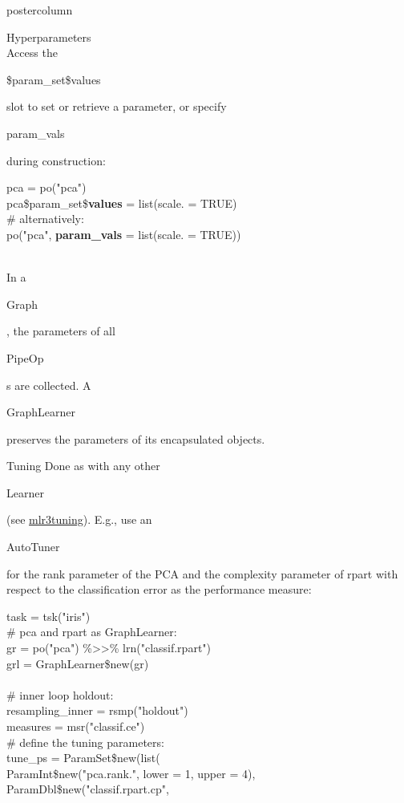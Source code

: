 \documentclass{beamer}
\newcommand{\codeinline}[1]{\begin{codeboxinline}#1\end{codeboxinline}}
\begin{document}
\begin{frame}[fragile]{}
\begin{columns}
\begin{column}{.245\textwidth}
\begin{beamercolorbox}[center]{postercolumn}
\begin{minipage}{.98\textwidth}
{\begin{myblock}{Hyperparameters}
              \ \\
              Access the \codeinline{\$param\_set\$values} slot to set or retrieve a parameter, or specify \codeinline{param\_vals} during construction:
              \begin{codeboxmultiline}[width=24cm]
                {\footnotesize pca = po("pca") \\
                pca\$param\_set\$\textbf{values} = list(scale. = TRUE) \\
                \# alternatively:\\
                po("pca", \textbf{param\_vals} = list(scale. = TRUE))}
              \end{codeboxmultiline}
              \ \\
              In a \codeinline{Graph}, the parameters of all \codeinline{PipeOp}s are collected. A \codeinline{GraphLearner} preserves the parameters of its encapsulated objects.
            \end{myblock}
            \begin{myblock}{Tuning}
              Done as with any other \codeinline{Learner} (see \href{FIXME:CheatsheetLink}{mlr3tuning}). E.g., use an \codeinline{AutoTuner} for the rank parameter of the PCA and the complexity parameter of rpart with respect to the classification error as the performance measure:
              \begin{codeboxexample}
						  {\footnotesize
                task = tsk("iris")\\
                \# pca and rpart as GraphLearner:\\
                gr = po("pca") \%>{}>\% lrn("classif.rpart")\\
                grl = GraphLearner\$new(gr)\\
                \ \\
                \# inner loop holdout:\\
                resampling\_inner = rsmp("holdout")\\
                measures = msr("classif.ce")\\
                \# define the tuning parameters:\\
                tune\_ps = ParamSet\$new(list(\\
                \hspace*{1ex} ParamInt\$new("pca.rank.", lower = 1, upper = 4),\\
                \hspace*{1ex} ParamDbl\$new("classif.rpart.cp",\\
}
\end{codeboxexample}
\end{myblock}}
\end{minipage}
\end{beamercolorbox}
\end{column}
\end{columns}
\end{frame}
\end{document}
